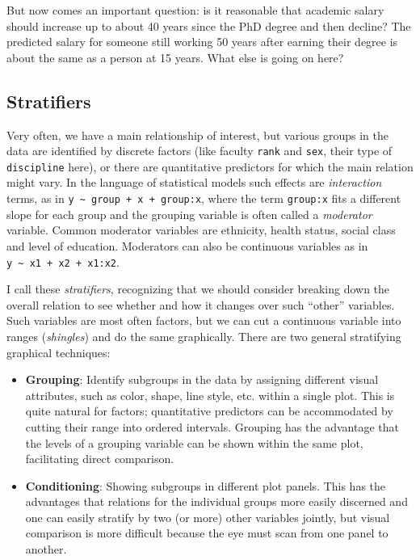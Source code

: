 \documentclass[
  letterpaper,
  10pt,
  krantz2]{krantz}
\begin{document}
But now comes an important question: is it reasonable that academic
salary should increase up to about 40 years since the PhD degree and
then decline? The predicted salary for someone still working 50 years
after earning their degree is about the same as a person at 15 years.
What else is going on here?

\subsection{Stratifiers}\label{stratifiers}

Very often, we have a main relationship of interest, but various groups
in the data are identified by discrete factors (like faculty
\texttt{rank} and \texttt{sex}, their type of \texttt{discipline} here),
or there are quantitative predictors for which the main relation might
vary. In the language of statistical models such effects are
\emph{interaction} terms, as in
\texttt{y\ \textasciitilde{}\ group\ +\ x\ +\ group:x}, where the term
\texttt{group:x} fits a different slope for each group and the grouping
variable is often called a \emph{moderator} variable. Common moderator
variables are ethnicity, health status, social class and level of
education. Moderators can also be continuous variables as in
\texttt{y\ \textasciitilde{}\ x1\ +\ x2\ +\ x1:x2}.

I call these \emph{stratifiers}, recognizing that we should consider
breaking down the overall relation to see whether and how it changes
over such ``other'' variables. Such variables are most often factors,
but we can cut a continuous variable into ranges (\emph{shingles}) and
do the same graphically. There are two general stratifying graphical
techniques:

\begin{itemize}
\item
  \textbf{Grouping}: Identify subgroups in the data by assigning
  different visual attributes, such as color, shape, line style, etc.
  within a single plot. This is quite natural for factors; quantitative
  predictors can be accommodated by cutting their range into ordered
  intervals. Grouping has the advantage that the levels of a grouping
  variable can be shown within the same plot, facilitating direct
  comparison.
\item
  \textbf{Conditioning}: Showing subgroups in different plot panels.
  This has the advantages that relations for the individual groups more
  easily discerned and one can easily stratify by two (or more) other
  variables jointly, but visual comparison is more difficult because the
  eye must scan from one panel to another.
\end{itemize}
\end{document}
